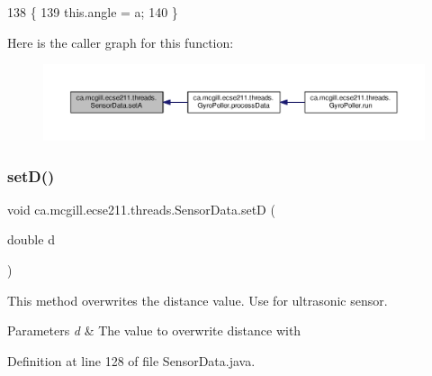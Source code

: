 \begin{DoxyCode}
138                              \{
139       this.angle = a;
140   \}
\end{DoxyCode}
Here is the caller graph for this function\+:
\nopagebreak
\begin{figure}[H]
\begin{center}
\leavevmode
\includegraphics[width=350pt]{classca_1_1mcgill_1_1ecse211_1_1threads_1_1_sensor_data_a35b1941d44e86b81eb7c625efbd3c8ba_icgraph}
\end{center}
\end{figure}
\mbox{\label{classca_1_1mcgill_1_1ecse211_1_1threads_1_1_sensor_data_a2c1f8e625478b89aabe6e9911e482ef3}} 
\subsubsection{\texorpdfstring{set\+D()}{setD()}}
{\footnotesize\ttfamily void ca.\+mcgill.\+ecse211.\+threads.\+Sensor\+Data.\+setD (\begin{DoxyParamCaption}\item[{double}]{d }\end{DoxyParamCaption})}

This method overwrites the distance value. Use for ultrasonic sensor.


\begin{DoxyParams}{Parameters}
{\em d} & The value to overwrite distance with \\
\hline
\end{DoxyParams}


Definition at line 128 of file Sensor\+Data.\+java.


